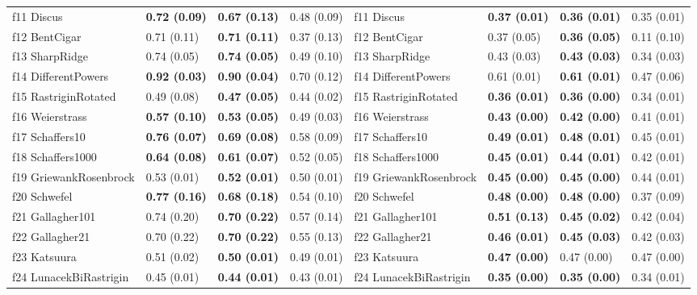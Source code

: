 \begin{table}
\begin{tabular}{llllllll}
f11 Discus & \textbf{0.72 (0.09)} & \textbf{0.67 (0.13)} & 0.48 (0.09) & f11 Discus & \textbf{0.37 (0.01)} & \textbf{0.36 (0.01)} & 0.35 (0.01) \\
f12 BentCigar & 0.71 (0.11) & \textbf{0.71 (0.11)} & 0.37 (0.13) & f12 BentCigar & 0.37 (0.05) & \textbf{0.36 (0.05)} & 0.11 (0.10) \\
f13 SharpRidge & 0.74 (0.05) & \textbf{0.74 (0.05)} & 0.49 (0.10) & f13 SharpRidge & 0.43 (0.03) & \textbf{0.43 (0.03)} & 0.34 (0.03) \\
f14 DifferentPowers & \textbf{0.92 (0.03)} & \textbf{0.90 (0.04)} & 0.70 (0.12) & f14 DifferentPowers & 0.61 (0.01) & \textbf{0.61 (0.01)} & 0.47 (0.06) \\
f15 RastriginRotated & 0.49 (0.08) & \textbf{0.47 (0.05)} & 0.44 (0.02) & f15 RastriginRotated & \textbf{0.36 (0.01)} & \textbf{0.36 (0.00)} & 0.34 (0.01) \\
f16 Weierstrass & \textbf{0.57 (0.10)} & \textbf{0.53 (0.05)} & 0.49 (0.03) & f16 Weierstrass & \textbf{0.43 (0.00)} & \textbf{0.42 (0.00)} & 0.41 (0.01) \\
f17 Schaffers10 & \textbf{0.76 (0.07)} & \textbf{0.69 (0.08)} & 0.58 (0.09) & f17 Schaffers10 & \textbf{0.49 (0.01)} & \textbf{0.48 (0.01)} & 0.45 (0.01) \\
f18 Schaffers1000 & \textbf{0.64 (0.08)} & \textbf{0.61 (0.07)} & 0.52 (0.05) & f18 Schaffers1000 & \textbf{0.45 (0.01)} & \textbf{0.44 (0.01)} & 0.42 (0.01) \\
f19 GriewankRosenbrock & 0.53 (0.01) & \textbf{0.52 (0.01)} & 0.50 (0.01) & f19 GriewankRosenbrock & \textbf{0.45 (0.00)} & \textbf{0.45 (0.00)} & 0.44 (0.01) \\
f20 Schwefel & \textbf{0.77 (0.16)} & \textbf{0.68 (0.18)} & 0.54 (0.10) & f20 Schwefel & \textbf{0.48 (0.00)} & \textbf{0.48 (0.00)} & 0.37 (0.09) \\
f21 Gallagher101 & 0.74 (0.20) & \textbf{0.70 (0.22)} & 0.57 (0.14) & f21 Gallagher101 & \textbf{0.51 (0.13)} & \textbf{0.45 (0.02)} & 0.42 (0.04) \\
f22 Gallagher21 & 0.70 (0.22) & \textbf{0.70 (0.22)} & 0.55 (0.13) & f22 Gallagher21 & \textbf{0.46 (0.01)} & \textbf{0.45 (0.03)} & 0.42 (0.03) \\
f23 Katsuura & 0.51 (0.02) & \textbf{0.50 (0.01)} & 0.49 (0.01) & f23 Katsuura & \textbf{0.47 (0.00)} & 0.47 (0.00) & 0.47 (0.00) \\
f24 LunacekBiRastrigin & 0.45 (0.01) & \textbf{0.44 (0.01)} & 0.43 (0.01) & f24 LunacekBiRastrigin & \textbf{0.35 (0.00)} & \textbf{0.35 (0.00)} & 0.34 (0.01) \\
\bottomrule
\end{tabular}
\end{table}
